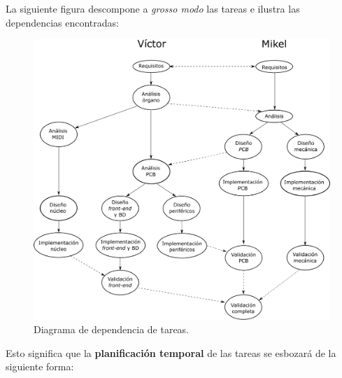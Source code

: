 La siguiente figura descompone a \textit{grosso modo} las tareas e ilustra las dependencias encontradas:

\smallskip

\begin{figure}[H]
	\noindent \begin{centering}
		\includegraphics[width=\linewidth*3/4]{capitulo5/planificacion}
		\par\end{centering}
	\smallskip
	\caption{\label{fig:planificacion} Diagrama de dependencia de tareas.}
\end{figure} 

\smallskip

Esto significa que la \textbf{planificación temporal} de las tareas se esbozará de la siguiente forma:

\smallskip

